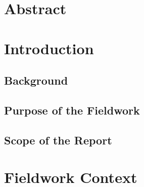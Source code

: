 \documentclass[12pt,a4paper]{report}
\begin{document}

\setcounter{secnumdepth}{-1}


\chapter*{Abstract}


\tableofcontents
\clearpage


\setcounter{secnumdepth}{3}


\chapter{Introduction}

\section{Background}

\section{Purpose of the Fieldwork}

\section{Scope of the Report}


\chapter{Fieldwork Context}
\end{document}
